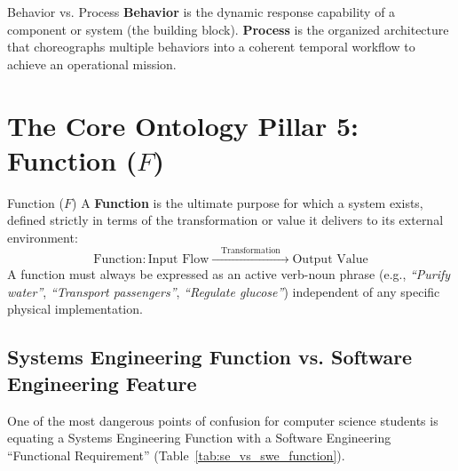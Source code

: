 \begin{takeawaybox}{Behavior vs. Process}
\textbf{Behavior} is the dynamic response capability of a component or system (the building block). \textbf{Process} is the organized architecture that choreographs multiple behaviors into a coherent temporal workflow to achieve an operational mission.
\end{takeawaybox}

\section{The Core Ontology Pillar 5: Function (\texorpdfstring{$F$}{F})}
\label{sec:ontology_function}

\begin{definitionbox}{Function ($F$)}
A \textbf{Function} is the ultimate purpose for which a system exists, defined strictly in terms of the transformation or value it delivers to its external environment:
\begin{equation}
    \text{Function}: \text{Input Flow} \xrightarrow{\quad \text{Transformation} \quad} \text{Output Value}
\end{equation}
A function must always be expressed as an active verb-noun phrase (e.g., \textit{``Purify water''}, \textit{``Transport passengers''}, \textit{``Regulate glucose''}) independent of any specific physical implementation.
\end{definitionbox}

\subsection{Systems Engineering Function vs. Software Engineering Feature}
One of the most dangerous points of confusion for computer science students is equating a Systems Engineering Function with a Software Engineering ``Functional Requirement'' (Table~\ref{tab:se_vs_swe_function}).

